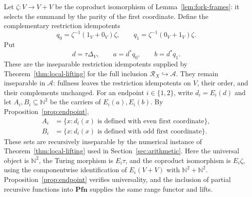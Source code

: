 \documentclass[11pt]{article}
\newcommand{\N}{\mathbb N}
\newcommand{\Pfn}{\mathbf{Pfn}}
\begin{document}
Let $\zeta:V\to V+V$ be the coproduct isomorphism of
Lemma~\ref{lem:fork-frames}: it selects the summand by the parity
of the first coordinate. Define the complementary restriction idempotents
\[
 q_0=\zeta^{-1}(1_V+0_V)\zeta,\qquad
 q_1=\zeta^{-1}(0_V+1_V)\zeta.
\]
Put
\[
 d=\tau\Delta_V,\qquad a=d^*q_0,\qquad b=d^*q_1.
\]
These are the inseparable restriction idempotents supplied by
Theorem~\ref{thm:local-lifting} for the full inclusion
$\mathscr R_X\hookrightarrow\mathcal A$. They remain inseparable
in $\mathcal A$: fullness leaves the restriction idempotents on $V$, their order,
and their complements unchanged.
For an endpoint $i\in\{1,2\}$,
write $d_i=E_i(d)$ and let $A_i,B_i\subseteq\N^2$ be the
carriers of $E_i(a),E_i(b)$. By Proposition~\ref{prop:endpoint},
\begin{align*}
 A_i&=\{x:d_i(x)\text{ is defined with even first coordinate}\},\\
 B_i&=\{x:d_i(x)\text{ is defined with odd first coordinate}\}.
\end{align*}
These sets are recursively inseparable by the numerical instance
of Theorem~\ref{thm:local-lifting} used in
Section~\ref{sec:arithmetic}. Here the universal object is $\N^2$,
the Turing morphism is $E_i\tau$, and the coproduct isomorphism
is $E_i\zeta$, using the componentwise identification of
$E_i(V+V)$ with $\N^2+\N^2$. Proposition~\ref{prop:endpoint}
verifies universality, and the inclusion of partial recursive
functions into $\Pfn$ supplies the same range functor and lifts.
\end{document}
